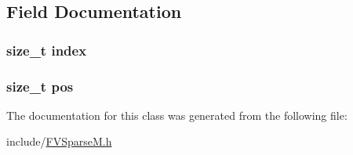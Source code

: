 \subsection{Field Documentation}
\hypertarget{classSparseNode_a3f42f10d93f6edb91d7d3f6edad25921}{
\subsubsection[{index}]{\setlength{\rightskip}{0pt plus 5cm}size\_\-t {\bf index}}}
\label{d3/d91/classSparseNode_a3f42f10d93f6edb91d7d3f6edad25921}
\hypertarget{classSparseNode_a5438a597ee291f523ae04a9fe355924f}{
\subsubsection[{pos}]{\setlength{\rightskip}{0pt plus 5cm}size\_\-t {\bf pos}}}
\label{d3/d91/classSparseNode_a5438a597ee291f523ae04a9fe355924f}


The documentation for this class was generated from the following file:\begin{DoxyCompactItemize}
\item 
include/\hyperlink{FVSparseM_8h}{FVSparseM.h}\end{DoxyCompactItemize}
